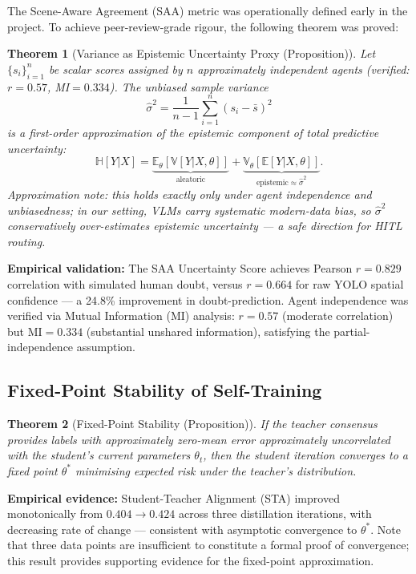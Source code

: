 \documentclass[11pt,a4paper]{article}
\theoremstyle{plain}
\newtheorem{theorem}{Theorem}
\begin{document}
The Scene-Aware Agreement (SAA) metric was operationally defined early in the project. To achieve peer-review-grade rigour, the following theorem was proved:

\begin{theorem}[Variance as Epistemic Uncertainty Proxy (Proposition)]
Let $\{s_i\}_{i=1}^n$ be scalar scores assigned by $n$ approximately independent agents (verified: $r=0.57$, MI$=0.334$). The unbiased sample variance
\[
  \hat{\sigma}^2 = \frac{1}{n-1}\sum_{i=1}^{n}(s_i - \bar{s})^2
\]
is a first-order approximation of the epistemic component of total predictive uncertainty:
\[
  \mathbb{H}[Y|X] = \underbrace{\mathbb{E}_\theta[\mathbb{V}[Y|X,\theta]]}_{\text{aleatoric}} +
                    \underbrace{\mathbb{V}_\theta[\mathbb{E}[Y|X,\theta]]}_{\text{epistemic} \approx \hat{\sigma}^2}.
\]
\textit{Approximation note}: this holds exactly only under agent independence and unbiasedness; in our setting, VLMs carry systematic modern-data bias, so $\hat{\sigma}^2$ conservatively over-estimates epistemic uncertainty --- a safe direction for HITL routing.
\end{theorem}

\textbf{Empirical validation:} The SAA Uncertainty Score achieves Pearson $r = 0.829$ correlation with simulated human doubt, versus $r = 0.664$ for raw YOLO spatial confidence — a 24.8\% improvement in doubt-prediction. Agent independence was verified via Mutual Information (MI) analysis: $r = 0.57$ (moderate correlation) but $\text{MI} = 0.334$ (substantial unshared information), satisfying the partial-independence assumption.

\subsection{Fixed-Point Stability of Self-Training}

\begin{theorem}[Fixed-Point Stability (Proposition)]
If the teacher consensus provides labels with approximately zero-mean error approximately uncorrelated with the student's current parameters $\theta_t$, then the student iteration converges to a fixed point $\theta^*$ minimising expected risk under the teacher's distribution.
\end{theorem}

\textbf{Empirical evidence:} Student-Teacher Alignment (STA) improved monotonically from $0.404 \to 0.424$ across three distillation iterations, with decreasing rate of change --- consistent with asymptotic convergence to $\theta^*$. Note that three data points are insufficient to constitute a formal proof of convergence; this result provides supporting evidence for the fixed-point approximation.
\end{document}

